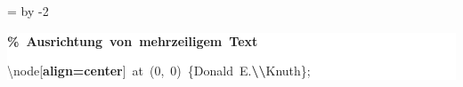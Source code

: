 \begingroup
\ttfamily
{}
=\textwidth
\advance{} by -2\fboxsep
\noindent
\colorbox{background}
{%
\parbox{\dimen255}
{%
\rule[-0.5ex]{0pt}{2.5ex}\hspace*{0.0em}\textcolor{G}{\textbf{\%~Ausrichtung~von~mehrzeiligem~Text}}\\
\rule[-0.5ex]{0pt}{2.5ex}\hspace*{0.0em}\textbackslash{}node[\textcolor{R}{\textbf{align=center}}]~at~(0,~0)~\{Donald~E.\textcolor{R}{\textbf{\textbackslash{}\textbackslash{}}}Knuth\};}%
}%
\endgroup
